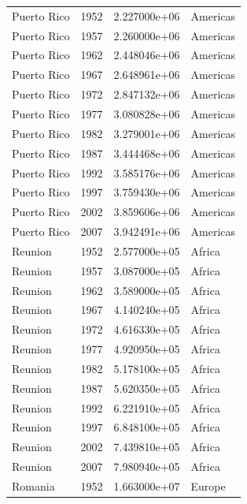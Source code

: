 \documentclass[
  letterpaper,
  DIV=11,
  numbers=noendperiod]{scrreprt}
\begin{document}
\begin{tcolorbox}
\begin{tabular}{lrrl}
Puerto Rico              &  1952 &  2.227000e+06 &  Americas \\
Puerto Rico              &  1957 &  2.260000e+06 &  Americas \\
Puerto Rico              &  1962 &  2.448046e+06 &  Americas \\
Puerto Rico              &  1967 &  2.648961e+06 &  Americas \\
Puerto Rico              &  1972 &  2.847132e+06 &  Americas \\
Puerto Rico              &  1977 &  3.080828e+06 &  Americas \\
Puerto Rico              &  1982 &  3.279001e+06 &  Americas \\
Puerto Rico              &  1987 &  3.444468e+06 &  Americas \\
Puerto Rico              &  1992 &  3.585176e+06 &  Americas \\
Puerto Rico              &  1997 &  3.759430e+06 &  Americas \\
Puerto Rico              &  2002 &  3.859606e+06 &  Americas \\
Puerto Rico              &  2007 &  3.942491e+06 &  Americas \\
Reunion                  &  1952 &  2.577000e+05 &    Africa \\
Reunion                  &  1957 &  3.087000e+05 &    Africa \\
Reunion                  &  1962 &  3.589000e+05 &    Africa \\
Reunion                  &  1967 &  4.140240e+05 &    Africa \\
Reunion                  &  1972 &  4.616330e+05 &    Africa \\
Reunion                  &  1977 &  4.920950e+05 &    Africa \\
Reunion                  &  1982 &  5.178100e+05 &    Africa \\
Reunion                  &  1987 &  5.620350e+05 &    Africa \\
Reunion                  &  1992 &  6.221910e+05 &    Africa \\
Reunion                  &  1997 &  6.848100e+05 &    Africa \\
Reunion                  &  2002 &  7.439810e+05 &    Africa \\
Reunion                  &  2007 &  7.980940e+05 &    Africa \\
Romania                  &  1952 &  1.663000e+07 &    Europe \\

\end{tabular}
\end{tcolorbox}
\end{document}
